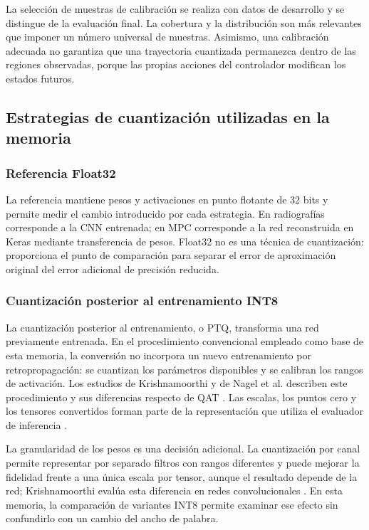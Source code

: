 La selección de muestras de calibración se realiza con datos de desarrollo y se distingue de la evaluación final. La cobertura y la distribución son más relevantes que imponer un número universal de muestras. Asimismo, una calibración adecuada no garantiza que una trayectoria cuantizada permanezca dentro de las regiones observadas, porque las propias acciones del controlador modifican los estados futuros.

\subsection{Estrategias de cuantización utilizadas en la memoria}
\subsubsection{Referencia Float32}
La referencia mantiene pesos y activaciones en punto flotante de 32 bits y permite medir el cambio introducido por cada estrategia. En radiografías corresponde a la CNN entrenada; en MPC corresponde a la red reconstruida en Keras mediante transferencia de pesos. Float32 no es una técnica de cuantización: proporciona el punto de comparación para separar el error de aproximación original del error adicional de precisión reducida.

\subsubsection{Cuantización posterior al entrenamiento INT8}
La cuantización posterior al entrenamiento, o PTQ, transforma una red previamente entrenada. En el procedimiento convencional empleado como base de esta memoria, la conversión no incorpora un nuevo entrenamiento por retropropagación: se cuantizan los parámetros disponibles y se calibran los rangos de activación. Los estudios de Krishnamoorthi y de Nagel et al. describen este procedimiento y sus diferencias respecto de QAT \cite{krishnamoorthi2018,nagel2021}. Las escalas, los puntos cero y los tensores convertidos forman parte de la representación que utiliza el evaluador de inferencia \cite{litertptq}.

La granularidad de los pesos es una decisión adicional. La cuantización por canal permite representar por separado filtros con rangos diferentes y puede mejorar la fidelidad frente a una única escala por tensor, aunque el resultado depende de la red; Krishnamoorthi evalúa esta diferencia en redes convolucionales \cite{krishnamoorthi2018}. En esta memoria, la comparación de variantes INT8 permite examinar ese efecto sin confundirlo con un cambio del ancho de palabra.

